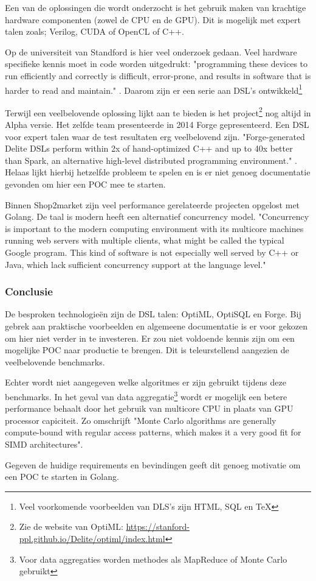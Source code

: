 Een van de oplossingen die wordt onderzocht is het gebruik maken van krachtige hardware componenten (zowel de CPU en de GPU). Dit is mogelijk met expert talen zoals; Verilog, CUDA of OpenCL of C++.

Op de universiteit van Standford is hier veel onderzoek gedaan. Veel hardware specifieke kennis moet in code worden uitgedrukt: "programming these devices to run efficiently and correctly is difficult, error-prone, and results in software that is harder to read and maintain." \parencite{sujeeth2011optiml}. Daarom zijn er een serie aan DSL's ontwikkeld\footnote{Veel voorkomende voorbeelden van DLS's zijn HTML, SQL en \TeX \parencite{sigplan2000dsl}}

Terwijl \textcite{sujeeth2011optiml} een veelbelovende oplossing lijkt aan te bieden is het project\footnote{Zie de website van OptiML: \url{https://stanford-ppl.github.io/Delite/optiml/index.html}} nog altijd in Alpha versie. Het zelfde team presenteerde in 2014 Forge gepresenteerd. Een DSL voor expert talen waar de test resultaten erg veelbelovend zijn. "Forge-generated Delite DSLs perform within 2x of hand-optimized C++ and up to 40x better than Spark, an alternative high-level distributed programming environment." \parencite{sujeeth2014forge}. Helaas lijkt hierbij hetzelfde probleem te spelen en is er niet genoeg documentatie gevonden om hier een POC mee te starten.

Binnen Shop2market zijn veel performance gerelateerde projecten opgelost met Golang. De taal is modern heeft een alternatief concurrency model. "Concurrency is important to the modern computing environment with its multicore machines running web servers with multiple clients, what might be called the typical Google program. This kind of software is not especially well served by C++ or Java, which lack sufficient concurrency support at the language level." \parencite{pike2012go}

\subsubsection{\textbf{Conclusie}}

De besproken technologieën zijn de DSL talen: OptiML, OptiSQL en Forge. Bij gebrek aan praktische voorbeelden en algemeene documentatie is er voor gekozen om hier niet verder in te investeren. Er zou niet voldoende kennis zijn om een mogelijke POC naar productie te brengen. Dit is teleurstellend aangezien de veelbelovende benchmarks.

Echter wordt niet aangegeven welke algoritmes er zijn gebruikt tijdens deze benchmarks. In het geval van data aggregatie\footnote{Voor data aggregaties worden methodes als MapReduce of Monte Carlo gebruikt} wordt er mogelijk een betere performance behaalt door het gebruik van multicore CPU in plaats van GPU processor capiciteit. Zo omschrijft \textcite{lee2010debunking} "Monte Carlo algorithms are generally compute-bound with regular access patterns, which makes it a very good fit for SIMD architectures".

Gegeven de huidige requirements en bevindingen geeft dit genoeg motivatie om een POC te starten in Golang.

